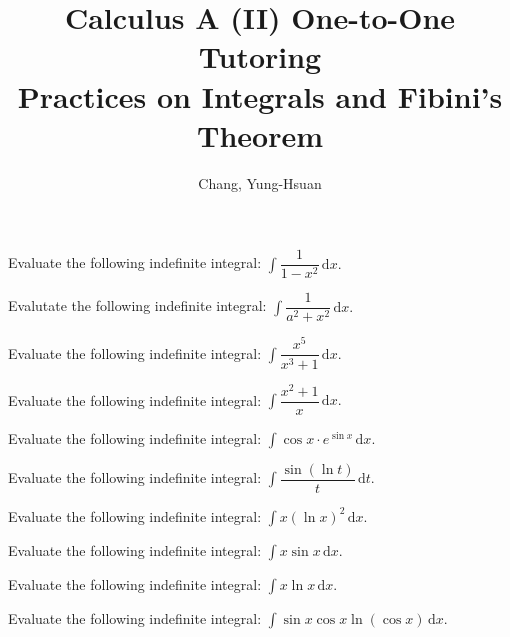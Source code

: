 \documentclass[11pt]{article}
\title{\textbf{Calculus A (II) One-to-One Tutoring}\\ \Large Practices on Integrals and Fibini's Theorem}
\author{Chang, Yung-Hsuan}
\theoremstyle{break}
\theoremstyle{no_label}
\newcommand{\ddi}{\text{$\,$d}}
\numberwithin{equation}{theorem}
\begin{document}
\maketitle

\begin{example}
    Evaluate the following indefinite integral: $\displaystyle\int \dfrac{1}{1-x^2}\ddi x.$
\end{example}


\begin{example}
    Evalutate the following indefinite integral: $\displaystyle\int \dfrac{1}{a^2+x^2}\ddi x.$
\end{example}


\begin{example}
    Evaluate the following indefinite integral: $\displaystyle\int \dfrac{x^5}{x^3+1}\ddi x.$
\end{example}


\begin{example}
    Evaluate the following indefinite integral: $\displaystyle\int \dfrac{x^2+1}{x}\ddi x.$
\end{example}


\begin{example}
    Evaluate the following indefinite integral: $\displaystyle\int \cos x\cdot e^{\sin x}\ddi x.$
\end{example}


\begin{example}
    Evaluate the following indefinite integral: $\displaystyle\int\dfrac{\sin(\ln t)}{t}\ddi t.$
\end{example}


\begin{example}
    Evaluate the following indefinite integral: $\displaystyle\int x(\ln x)^2\ddi x.$
\end{example}


\begin{example}
    Evaluate the following indefinite integral: $\displaystyle\int x\sin x\ddi x.$
\end{example}


\begin{example}
    Evaluate the following indefinite integral: $\displaystyle\int x\ln x\ddi x.$
\end{example}


\begin{example}
    Evaluate the following indefinite integral: $\displaystyle\int \sin x\cos x\ln(\cos x)\ddi x.$
\end{example}
\end{document}
